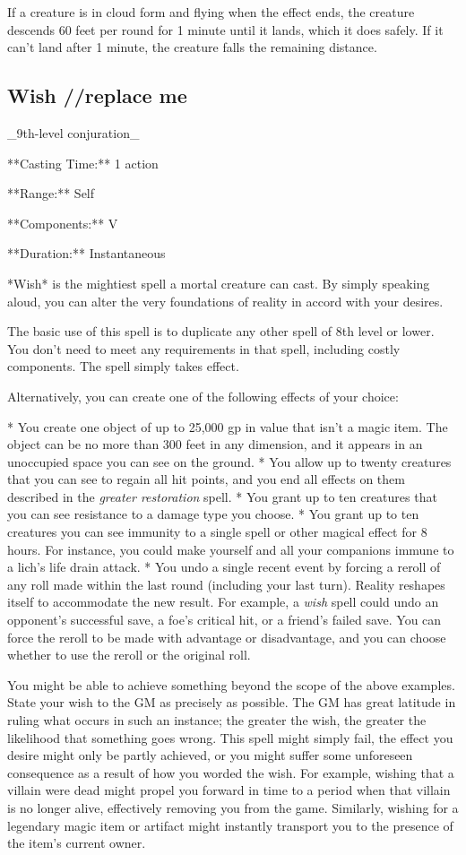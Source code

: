 If a creature is in cloud form and flying when the effect ends, the creature descends 60 feet per round for 1 minute until it lands, which it does safely. If it can’t land after 1 minute, the creature falls the remaining distance.

\subsection{Wish //replace me}

_9th-level conjuration_

**Casting Time:** 1 action

**Range:** Self

**Components:** V

**Duration:** Instantaneous

*Wish* is the mightiest spell a mortal creature can cast. By simply speaking aloud, you can alter the very foundations of reality in accord with your desires.

The basic use of this spell is to duplicate any other spell of 8th level or lower. You don’t need to meet any requirements in that spell, including costly components. The spell simply takes effect.

Alternatively, you can create one of the following effects of your choice:

* You create one object of up to 25,000 gp in value that isn’t a magic item. The object can be no more than 300 feet in any dimension, and it appears in an unoccupied space you can see on the ground.
* You allow up to twenty creatures that you can see to regain all hit points, and you end all effects on them described in the \textit{greater restoration} spell.
* You grant up to ten creatures that you can see resistance to a damage type you choose.
* You grant up to ten creatures you can see immunity to a single spell or other magical effect for 8 hours. For instance, you could make yourself and all your companions immune to a lich’s life drain attack.
* You undo a single recent event by forcing a reroll of any roll made within the last round (including your last turn). Reality reshapes itself to accommodate the new result. For example, a \textit{wish} spell could undo an opponent’s successful save, a foe’s critical hit, or a friend’s failed save. You can force the reroll to be made with advantage or disadvantage, and you can choose whether to use the reroll or the original roll.

You might be able to achieve something beyond the scope of the above examples. State your wish to the GM as precisely as possible. The GM has great latitude in ruling what occurs in such an instance; the greater the wish, the greater the likelihood that something goes wrong. This spell might simply fail, the effect you desire might only be partly achieved, or you might suffer some unforeseen consequence as a result of how you worded the wish. For example, wishing that a villain were dead might propel you forward in time to a period when that villain is no longer alive, effectively removing you from the game. Similarly, wishing for a legendary magic item or artifact might instantly transport you to the presence of the item’s current owner.

